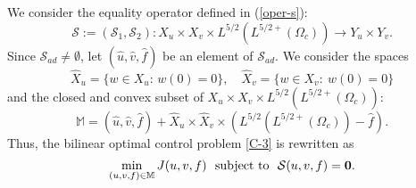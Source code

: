 \documentclass[11pt,reqno]{amsart}%
\numberwithin{equation}{section}
\begin{document}
{We consider the equality operator defined in (\ref{oper-s}):
$$\mathcal{S}:=(\mathcal{S}_1,\mathcal{S}_2):
{X}_{u}  \times {X}_{v} \times L^{5/2}(L^{5/2+}(\Omega_c))
\to Y_u \times Y_v. 
$$
Since $\mathcal{S}_{ad}\neq \emptyset$,  
let $(\widehat{u},\widehat{v},\widehat{f})$ be an element of $\mathcal{S}_{ad}$. We consider the spaces 
$$\widehat{X}_u=\{w \in X_u: \, w(0)=0\},
\quad 
\widehat{X}_v=\{w \in X_v: \ w(0)=0\}
$$
and  the closed and convex subset  of $X_u\times X_v\times L^{5/2}(L^{5/2+}(\Omega_c))$: 
$$\mathbb{M}=(\widehat{u},\widehat{v},\widehat{f})+\widehat{X}_{u}  
\times
\widehat{X}_{v}
\times
(L^{5/2}(L^{5/2+}(\Omega_c))-\widehat{f}).$$
Thus, the bilinear optimal control problem \eqref{C-3} is rewritten as
\begin{eqnarray}\label{sss-1}
\min_{ \left(u,v,f\right)\in \mathbb{M}}J(u,v,f)\ \mbox{ subject to }\ \mathcal{S}(u,v,f)={\bf 0}.
\end{eqnarray}

\

}
\end{document}
